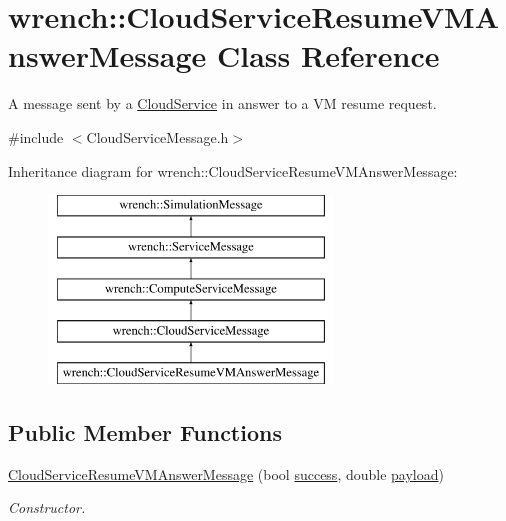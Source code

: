 \hypertarget{classwrench_1_1_cloud_service_resume_v_m_answer_message}{}\section{wrench\+:\+:Cloud\+Service\+Resume\+V\+M\+Answer\+Message Class Reference}
\label{classwrench_1_1_cloud_service_resume_v_m_answer_message}


A message sent by a \hyperlink{classwrench_1_1_cloud_service}{Cloud\+Service} in answer to a VM resume request.  




{\ttfamily \#include $<$Cloud\+Service\+Message.\+h$>$}

Inheritance diagram for wrench\+:\+:Cloud\+Service\+Resume\+V\+M\+Answer\+Message\+:\begin{figure}[H]
\begin{center}
\leavevmode
\includegraphics[height=5.000000cm]{classwrench_1_1_cloud_service_resume_v_m_answer_message}
\end{center}
\end{figure}
\subsection*{Public Member Functions}
\begin{DoxyCompactItemize}
\item 
\hyperlink{classwrench_1_1_cloud_service_resume_v_m_answer_message_a025748d3981a3e5cbc1661bf82e1a92f}{Cloud\+Service\+Resume\+V\+M\+Answer\+Message} (bool \hyperlink{classwrench_1_1_cloud_service_resume_v_m_answer_message_a695d0eb362c0ba59d81f17b34e9e36f9}{success}, double \hyperlink{classwrench_1_1_simulation_message_a914f2732713f7c02898e66f05a7cb8a1}{payload})
\begin{DoxyCompactList}\small\item\em Constructor. \end{DoxyCompactList}\end{DoxyCompactItemize}
